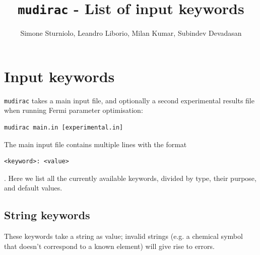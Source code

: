 \documentclass[]{article}
\title{\texttt{mudirac} - List of input keywords}
\author{Simone Sturniolo, Leandro Liborio, Milan Kumar, Subindev Devadasan}
\begin{document}
\maketitle

\section{Input keywords}\label{APP:keyw}

\texttt{mudirac} takes a main input file, and optionally a second experimental results file when running Fermi parameter optimisation:

\begin{verbatim}
mudirac main.in [experimental.in]
\end{verbatim}

The main input file contains multiple lines with the format

\begin{verbatim}
<keyword>: <value>
\end{verbatim}

. Here we list all the currently available keywords, divided by type, their purpose, and default values.
\subsection{String keywords}

These keywords take a string as value; invalid strings (e.g. a chemical symbol that doesn't correspond to a known element) will give rise to errors.
\end{document}
